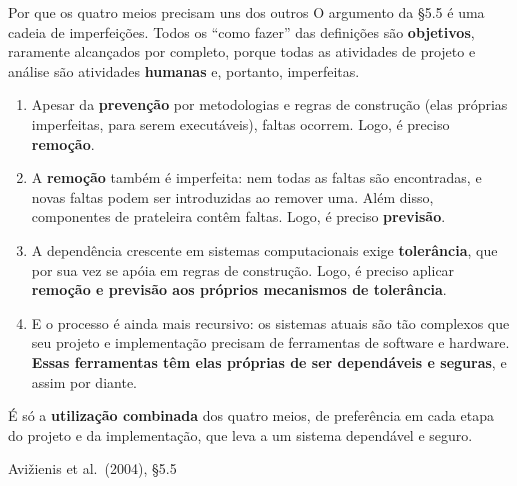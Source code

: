 \documentclass{beamer}
\newcommand{\sect}[1]{\par\smallskip\hfill{\tiny\color{black!55}Avi\v{z}ienis et al.\ (2004), #1}}
\begin{document}
\begin{frame}{Por que os quatro meios precisam uns dos outros}
    \footnotesize
    O argumento da \S5.5 \'e uma cadeia de imperfei\c{c}\~oes. Todos os ``como fazer'' das defini\c{c}\~oes s\~ao \textbf{objetivos}, raramente alcan\c{c}ados por completo, porque todas as atividades de projeto e an\'alise s\~ao atividades \textbf{humanas} e, portanto, imperfeitas.
    \medskip
    \begin{enumerate}
        \item Apesar da \textbf{preven\c{c}\~ao} por metodologias e regras de constru\c{c}\~ao (elas pr\'oprias imperfeitas, para serem execut\'aveis), faltas ocorrem. Logo, \'e preciso \textbf{remo\c{c}\~ao}.
        \item A \textbf{remo\c{c}\~ao} tamb\'em \'e imperfeita: nem todas as faltas s\~ao encontradas, e novas faltas podem ser introduzidas ao remover uma. Al\'em disso, componentes de prateleira cont\^em faltas. Logo, \'e preciso \textbf{previs\~ao}.
        \item A depend\^encia crescente em sistemas computacionais exige \textbf{toler\^ancia}, que por sua vez se ap\'oia em regras de constru\c{c}\~ao. Logo, \'e preciso aplicar \textbf{remo\c{c}\~ao e previs\~ao aos pr\'oprios mecanismos de toler\^ancia}.
        \item E o processo \'e ainda mais recursivo: os sistemas atuais s\~ao t\~ao complexos que seu projeto e implementa\c{c}\~ao precisam de ferramentas de software e hardware. \textbf{Essas ferramentas t\^em elas pr\'oprias de ser depend\'aveis e seguras}, e assim por diante.
    \end{enumerate}
    \medskip
    \begin{ancora}
        \footnotesize
        \'E s\'o a \textbf{utiliza\c{c}\~ao combinada} dos quatro meios, de prefer\^encia em cada etapa do projeto e da implementa\c{c}\~ao, que leva a um sistema depend\'avel e seguro.
    \end{ancora}
    \sect{\S5.5}
\end{frame}
\end{document}
